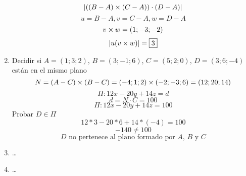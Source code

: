 \documentclass[../practica.root.tex]{subfiles}
\begin{document}
\begin{enumerate}
          \[ | ((B-A)\times(C-A))\cdot(D-A) | \]
          \[ u = B - A, v = C - A, w = D - A \]
          \[ v\times w = (1; -3; -2) \]
          \[ | u(v \times w) | = \boxed{3} \]

    \item Decidir si $A = (1;3;2)$, $B = (3;-1;6)$, $C = (5;2;0)$, $D = (3;6;-4)$ están en el mismo plano
          \[ N = (A-C) \times (B-C) = (-4;1;2) \times (-2;-3;6) = (12;20;14) \]
          \[ \Pi: 12x - 20y + 14z = d \]
          \[ d = N \cdot C = 100 \]
          \[ \Pi: 12x - 20y + 14z = 100 \]
          Probar $D \in \Pi$
          \[ 12*3 - 20*6 + 14*(-4) = 100 \]
          \[ -140 \neq 100 \]
          \[ \boxed{\text{$D$ no pertenece al plano formado por $A$, $B$ y $C$}} \]


    \item \dots
    \item \dots


\end{enumerate}
\end{document}
